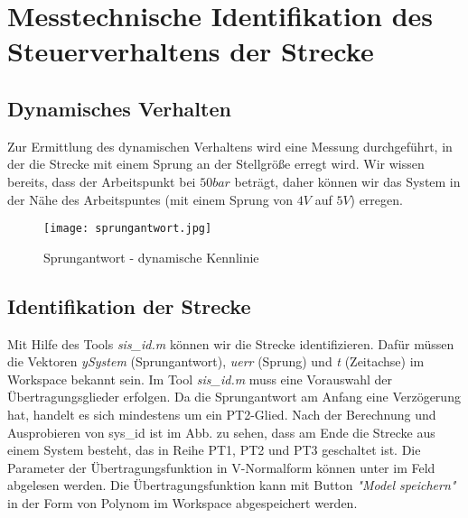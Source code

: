 








\newpage
[Perkowski]
\section{Messtechnische Identifikation des Steuerverhaltens der Strecke}


\subsection{Dynamisches Verhalten}

Zur Ermittlung des dynamischen Verhaltens wird eine Messung durchgeführt, in der die Strecke mit einem Sprung an der Stellgröße erregt wird. Wir wissen bereits, dass der Arbeitspunkt bei $50 bar$ beträgt, daher können wir das System in der Nähe des Arbeitspuntes (mit einem Sprung von $4V$ auf $5V$) erregen.

\begin{figure}[h]
	\begin{center}
		\texttt{[image: sprungantwort.jpg]}
		\caption{Sprungantwort - dynamische Kennlinie}
       \label{dynsprant}
	\end{center} 
\end{figure}

\subsection{Identifikation der Strecke}
Mit Hilfe des Tools \textit{sis\_id.m} können wir die Strecke identifizieren. Dafür müssen die Vektoren \textit{ySystem} (Sprungantwort), \textit{uerr} (Sprung) und \textit{t} (Zeitachse) im Workspace bekannt sein. Im Tool \textit{sis\_id.m} muss eine Vorauswahl der Übertragungsglieder erfolgen. Da die Sprungantwort am Anfang eine Verzögerung hat, handelt es sich mindestens um ein PT2-Glied. Nach der Berechnung und Ausprobieren von sys\_id ist im Abb. zu sehen, dass am Ende die Strecke aus einem System besteht, das in Reihe PT1, PT2 und PT3 geschaltet ist. Die Parameter der Übertragungsfunktion in V-Normalform können unter im Feld abgelesen werden. Die Übertragungsfunktion kann mit Button \textit{"Model speichern"} in der Form von Polynom im Workspace abgespeichert werden.

